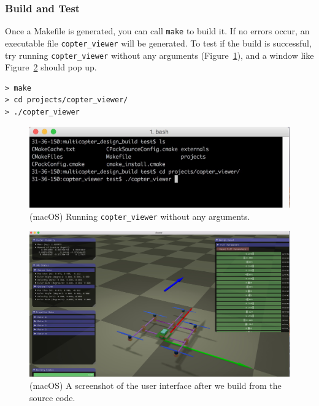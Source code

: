 \subsubsection{Build and Test}
Once a Makefile is generated, you can call \texttt{make} to build it. If no errors occur, an executable file \texttt{copter\_viewer} will be generated. To test if the build is successful, try running \texttt{copter\_viewer} without any arguments (Figure~\ref{fig:macos_run}), and a window like Figure~\ref{fig:macos_default_ui} should pop up.
\begin{verbatim}
> make
> cd projects/copter_viewer/
> ./copter_viewer
\end{verbatim}
\begin{figure}[!htb]
  \centering
  \includegraphics[width=0.75\linewidth]{macos_run}
  \caption{(macOS) Running \texttt{copter\_viewer} without any arguments.}
  \label{fig:macos_run}
\end{figure}

\begin{figure}[!htb]
  \centering
  \includegraphics[width=0.75\linewidth]{macos_default_ui}
  \caption{(macOS) A screenshot of the user interface after we build from the source code.}
  \label{fig:macos_default_ui}
\end{figure}